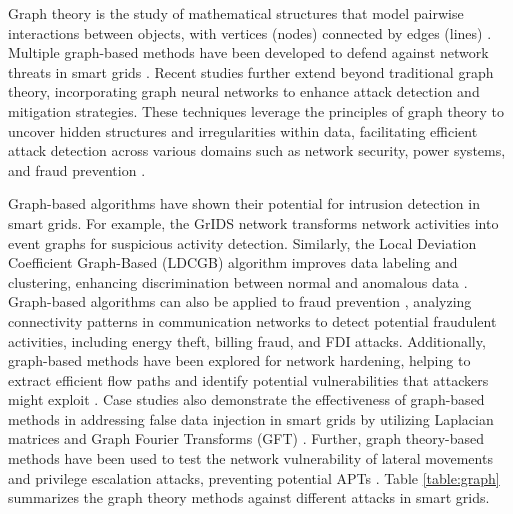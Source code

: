 \documentclass[10pt, journal]{IEEEtran}
\begin{document}
Graph theory is the study of mathematical structures that model pairwise interactions between objects, with vertices (nodes) connected by edges (lines) \cite{diestel2010graph}. Multiple graph-based methods have been developed to defend against network threats in smart grids \cite{staniford1996grids, mingqiang2012graph, ammann2002scalable, jha2002two, phillips1998graph}. Recent studies further extend beyond traditional graph theory, incorporating graph neural networks to enhance attack detection and mitigation strategies. These techniques leverage the principles of graph theory to uncover hidden structures and irregularities within data, facilitating efficient attack detection across various domains such as network security, power systems, and fraud prevention \cite{staniford1996grids, mingqiang2012graph, ammann2002scalable, jha2002two, phillips1998graph,swiler2001computer, noel2003efficient,drayer2019detection, jorjani2020graph, kosut2011malicious, kundur2010towards,pourhabibi2020fraud}. 


Graph-based algorithms have shown their potential for intrusion detection in smart grids.
For example, the GrIDS network transforms network activities into event graphs for suspicious activity detection. Similarly, the Local Deviation Coefficient Graph-Based (LDCGB) algorithm improves data labeling and clustering, enhancing discrimination between normal and anomalous data \cite{mingqiang2012graph}. Graph-based algorithms can also be applied to fraud prevention \cite{pourhabibi2020fraud}, analyzing connectivity patterns in communication networks to detect potential fraudulent activities, including energy theft, billing fraud, and FDI attacks. Additionally, graph-based methods have been explored for network hardening, helping to extract efficient flow paths and identify potential vulnerabilities that attackers might exploit \cite{wang2006minimum}. Case studies also demonstrate the effectiveness of graph-based methods in addressing false data injection in smart grids by utilizing Laplacian matrices and Graph Fourier Transforms (GFT) \cite{drayer2019detection, jorjani2020graph}. Further, graph theory-based methods have been used to test the network vulnerability of lateral movements and privilege escalation attacks, preventing potential APTs \cite{johnson2013graph}. Table \ref{table:graph} summarizes the graph theory methods against different attacks in smart grids. 

\end{document}
